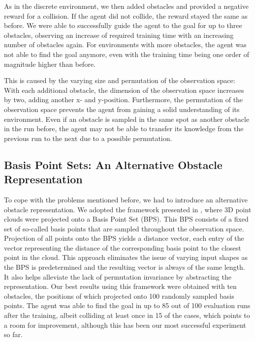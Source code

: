 \documentclass[conference]{IEEEtran}
\begin{document}
As in the discrete environment, we then added obstacles and provided a negative reward for a collision. If the agent did not collide, the reward stayed the same as before. We were able to successfully guide the agent to the goal for up to three obstacles, observing an increase of required training time with an increasing number of obstacles again. For environments with more obstacles, the agent was not able to find the goal anymore, even with the training time being one order of magnitude higher than before.

This is caused by the varying size and permutation of the observation space: With each additional obstacle, the dimension of the observation space increases by two, adding another x- and y-position. Furthermore, the permutation of the observation space prevents the agent from gaining a solid understanding of its environment. Even if an obstacle is sampled in the same spot as another obstacle in the run before, the agent may not be able to transfer its knowledge from the previous run to the next due to a possible permutation.

\subsection{Basis Point Sets: An Alternative Obstacle Representation}

To cope with the problems mentioned before, we had to introduce an alternative obstacle representation. We adopted the framework presented in \cite{b2}, where 3D point clouds were projected onto a Basis Point Set (BPS). This BPS consists of a fixed set of so-called basis points that are sampled throughout the observation space. Projection of all points onto the BPS yields a distance vector, each entry of the vector representing the distance of the corresponding basis point to the closest point in the cloud. This approach eliminates the issue of varying input shapes as the BPS is predetermined and the resulting vector is always of the same length. It also helps alleviate the lack of permutation invariance by abstracting the representation. 
Our best results using this framework were obtained with ten obstacles, the positions of which projected onto 100 randomly sampled basis points. The agent was able to find the goal in up to 85 out of 100 evaluation runs after the training, albeit colliding at least once in 15 of the cases, which points to a room for improvement, although this has been our most successful experiment so far.
\end{document}
